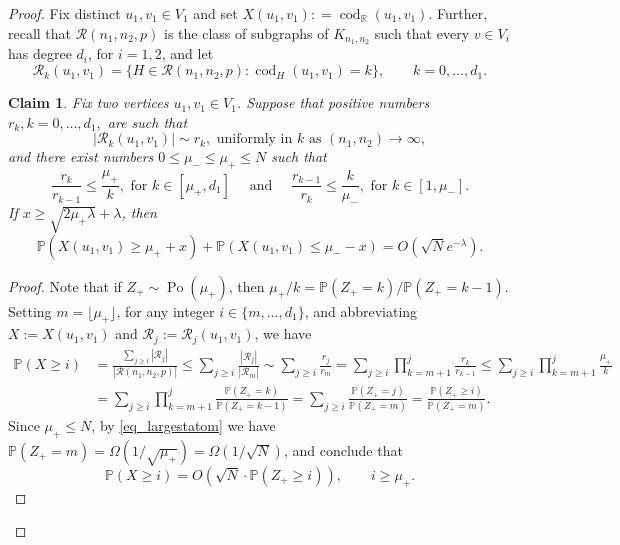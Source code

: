 \documentclass[12pt,reqno]{amsart}
\newcommand{\rc}{{\mathcal{R}}}
\newcommand{\rcnnp}{\rc(n_1,n_2,p)}
\newcommand{\Prob} {\mathbb {P}}
\newcommand{\prob}[1]{\Prob\left(#1\right)}
\newcommand{\R} {\mathbb R}
\newcommand{\Knn} {K_{n_1,n_2}}
\newcommand{\Po}{\operatorname{Po}}
\newcommand{\cod}{\operatorname{cod}}
\newtheorem{claim}[theorem]{Claim}
\theoremstyle{definition}
\begin{document}
\begin{proof}
	Fix distinct $u_1, v_1 \in V_1$ and set $X(u_1,v_1): = \cod_{\R}(u_1,v_1)$. Further, recall that $\rcnnp$ is the class of subgraphs of $\Knn$ such that every $v \in V_i$ has degree $d_i$, for $i = 1, 2$, and let
	\[
	  \rc_k(u_1,v_1) = \{H \in \rcnnp : \cod_H(u_1,v_1) = k \}, \qquad k = 0, \dots, d_1.
	  \]
	\begin{claim}
	  \label{clm_Poiss_bounds}
	 Fix two vertices $u_1,v_1\in V_1$. Suppose that positive numbers $r_k, k = 0, \dots, d_1,$ are such that
	  \begin{equation*}
	    |\rc_k(u_1,v_1)| \sim r_k, \text{ uniformly in $k$ as } (n_1, n_2) \to \infty,
	  \end{equation*}
	  and there exist numbers $0 \le \mu_- \le \mu_+ \le N$ such that
	  \begin{equation*}
	    \frac{r_k}{r_{k-1}} \le \frac{\mu_+}{k}, \text{ for } k \in [\mu_+, d_1]
	    \quad \text{ and } \quad
	    \frac{r_{k-1}}{r_k} \le \frac{k}{\mu_-}, \text{ for } k \in [1, \mu_-].
	  \end{equation*}
	  If $x \ge \sqrt{2\mu_+ \lambda} + \lambda$, then
	  \begin{equation}
	    \label{eq_twotailbound}
	    \prob{X(u_1,v_1) \ge \mu_+ + x} + \prob{X(u_1,v_1) \le \mu_- - x} = O(\sqrt{N} e^{-\lambda}).
	  \end{equation}
	\end{claim}
	\begin{proof}
	  Note that if $Z_+ \sim \Po(\mu_+)$, then $\mu_+/k = \prob{Z_+ = k}/\prob{Z_+ = k - 1}$. Setting $m = \lfloor \mu_+ \rfloor$,
	  for any integer $i\in\{m,\dots,d_1\}$, and abbreviating $X:=X(u_1,v_1)$ and $\rc_j:=\rc_j(u_1,v_1)$, we have
	  \begin{align*}
	    \prob{X \ge i}  &= \frac{\sum_{j \ge i}|\rc_j| }{|\rcnnp|}\le \sum_{j \ge i} \frac{|\rc_j|}{|\rc_{m}|} \sim \sum_{j \ge i} \frac{r_j}{r_m} = \sum_{j \ge i} \prod_{k = m + 1}^{j} \frac{r_k}{r_{k-1}} \le \sum_{j \ge i} \prod_{k = m + 1}^{j} \frac{\mu_+}{k}\\
	    &= \sum_{j \ge i} \prod_{k = m + 1}^{j}\frac{\prob{Z_+ = k}}{\prob{Z_+ = k-1}}  = \sum_{j \ge i} \frac{\prob{Z_+ = j}}{\prob{Z_+ = m}} = \frac{\prob{Z_+ \ge i}}{\prob{Z_+ = m}}.
	  \end{align*}
	  Since  $\mu_+ \le N$, by \eqref{eq_largestatom} we have $\prob{Z_+ = m} = \Omega(1/\sqrt{\mu_+}) = \Omega(1/\sqrt{N})$, and conclude that
	  \begin{equation}
	    \label{eq_Poisstail_up}
	    \prob{X \ge i} = O\left( \sqrt{N} \cdot \prob{Z_+ \ge i} \right), \qquad i \ge \mu_+.

\end{equation}
\end{proof}
\end{proof}
\end{document}
